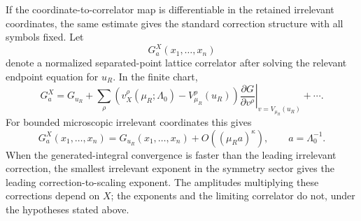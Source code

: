 If the coordinate-to-correlator map is differentiable in the retained
irrelevant coordinates, the same estimate gives the standard correction
structure with all symbols fixed.  Let
\[
  G^X_a(x_1,\ldots,x_n)
\]
denote a normalized separated-point lattice correlator after solving the
relevant endpoint equation for \(u_R\).  In the finite chart,
\[
  G^X_a
  =
  G_{u_R}
  +
  \sum_\rho
  \left(
    v^\rho_X(\mu_R;\Lambda_0)-V^\rho_{\mu_R}(u_R)
  \right)
  \left.
    \frac{\partial G}{\partial v^\rho}
  \right|_{v=V_{\mu_R}(u_R)}
  +
  \cdots .
\]
For bounded microscopic irrelevant coordinates this gives
\[
  G^X_a(x_1,\ldots,x_n)
  =
  G_{u_R}(x_1,\ldots,x_n)
  +
  O((\mu_R a)^\kappa),
  \qquad
  a=\Lambda_0^{-1}.
\]
When the generated-integral convergence is faster than the leading irrelevant
correction, the smallest irrelevant exponent in the symmetry sector gives the
leading correction-to-scaling exponent.  The amplitudes multiplying these
corrections depend on \(X\); the exponents and the limiting correlator do not,
under the hypotheses stated above.
